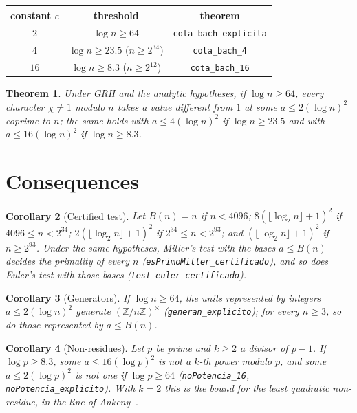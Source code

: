 \documentclass[11pt,a4paper]{amsart}
\newtheorem{theorem}{Theorem}
\newtheorem{corollary}[theorem]{Corollary}
\theoremstyle{remark}
\newcommand{\Z}{\mathbb{Z}}
\begin{document}
\begin{center}
\begin{tabular}{ccc}
\toprule
constant $c$ & threshold & theorem \\
\midrule
$2$ & $\log n\ge64$ & \texttt{cota\_bach\_explicita}\\
$4$ & $\log n\ge23.5$ ($n\ge2^{34}$) & \texttt{cota\_bach\_4}\\
$16$ & $\log n\ge8.3$ ($n\ge2^{12}$) & \texttt{cota\_bach\_16}\\
\bottomrule
\end{tabular}
\end{center}

\begin{theorem}
Under GRH and the analytic hypotheses, if $\log n\ge64$, every character $\chi\ne1$ modulo $n$ takes a value different from $1$ at some $a\le2(\log n)^2$ coprime to $n$; the same holds with $a\le4(\log n)^2$ if $\log n\ge23.5$ and with $a\le16(\log n)^2$ if $\log n\ge8.3$.
\end{theorem}

\section{Consequences}

\begin{corollary}[Certified test]
Let $B(n)=n$ if $n<4096$; $8(\lfloor\log_2n\rfloor+1)^2$ if $4096\le n<2^{34}$; $2(\lfloor\log_2n\rfloor+1)^2$ if $2^{34}\le n<2^{93}$; and $(\lfloor\log_2n\rfloor+1)^2$ if $n\ge2^{93}$. Under the same hypotheses, Miller's test with the bases $a\le B(n)$ decides the primality of every $n$ (\texttt{esPrimoMiller\_\allowbreak certificado}), and so does Euler's test with those bases (\texttt{test\_euler\_\allowbreak certificado}).
\end{corollary}

\begin{corollary}[Generators]
If $\log n\ge64$, the units represented by integers $a\le2(\log n)^2$ generate $(\Z/n\Z)^\times$ (\texttt{generan\_explicito}); for every $n\ge3$, so do those represented by $a\le B(n)$.
\end{corollary}

\begin{corollary}[Non-residues]
Let $p$ be prime and $k\ge2$ a divisor of $p-1$. If $\log p\ge8.3$, some $a\le16(\log p)^2$ is not a $k$-th power modulo $p$, and some $a\le2(\log p)^2$ is not one if $\log p\ge64$ (\texttt{noPotencia\_16}, \texttt{noPotencia\_explicito}). With $k=2$ this is the bound for the least quadratic non-residue, in the line of Ankeny~\cite{Ankeny}.
\end{corollary}
\end{document}
